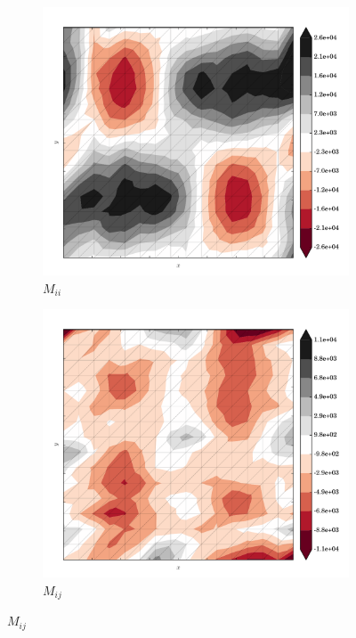 \begin{figure}
  \begin{subfigure}[b]{0.3\linewidth}
    \includegraphics[width=\linewidth]{images/stress_balance/FS/M_ii.pdf}
  \caption{$M_{ii}$}
  \label{fs_M_ii}
  \end{subfigure}
  \begin{subfigure}[b]{0.3\linewidth}
    \includegraphics[width=\linewidth]{images/stress_balance/FS/M_ij.pdf}
  \caption{$M_{ij}$}
  \label{fs_M_ij}
  \end{subfigure}

\end{figure}
